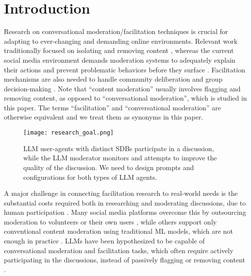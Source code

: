 %
\section{Introduction}
\label{sec:introduction}

Research on conversational moderation/facilitation techniques is crucial for adapting to ever-changing and demanding online environments. Relevant work traditionally focused on isolating and removing content \cite{seering_self_moderation, cresci_pesonalized_interventions}, whereas the current social media environment demands moderation systems to adequately explain their actions and prevent problematic behaviors before they surface \cite{cho-etal-2024-language, seering_self_moderation, cresci_pesonalized_interventions, make_reddit_great}.  Facilitation mechanisms are also needed to handle community deliberation and group decision-making \cite{kim_et_al_chatbot, seering_self_moderation}. Note that “content moderation” usually involves flagging and removing content, as opposed to “conversational moderation”, which is studied in this paper. The terms “facilitation” and “conversational moderation” are otherwise equivalent \cite{argyle2023, korre2025evaluation, falk-etal-2021-predicting} and we treat them as synonyms in this paper.

\begin{figure}[t]
	\centering
	\texttt{[image: research\_goal.png]}
	\caption{\ac{LLM} user-agents with distinct \acp{SDB} participate in a discussion, while the \ac{LLM} moderator monitors and attempts to improve the quality of the discussion. We need to design prompts and configurations for both types of \ac{LLM} agents.}
	\label{fig::goals}
\end{figure}

A major challenge in connecting facilitation research to real-world needs is    the substantial costs required both in researching and moderating discussions, due to human participation \cite{rossi_2024}. Many social media platforms overcome this by outsourcing moderation to volunteers or their own users \cite{Matias2019TheCL, schaffner_community_guidelines}, while others support only conventional content moderation using traditional \ac{ML} models, which are not enough in practice \cite{horta_automated_moderation, schaffner_community_guidelines}. \acfp{LLM} have been hypothesized to be capable of conversational moderation and facilitation tasks, which often require actively participating in the discussions, instead of passively flagging or removing content \cite{small-polis-llm, korre2025evaluation}. 

